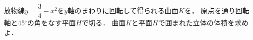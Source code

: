\documentclass[../../main.tex]{subfiles}
\begin{document}
放物線$\displaystyle y=\dfrac{3}{4}-x^2$を$y$軸のまわりに回転して得られる曲面$K$を，
原点を通り回転軸と45$^\circ$の角をなす平面$H$で切る．
曲面$K$と平面$H$で囲まれた立体の体積を求めよ．
\end{document}
